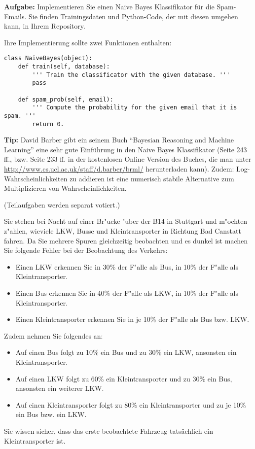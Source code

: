 \textbf{Aufgabe:} Implementieren Sie einen Naive Bayes Klassifikator für die
Spam-Emails. Sie finden Trainingsdaten und Python-Code, der mit diesen umgehen
kann, in Ihrem Repository.

Ihre Implementierung sollte zwei Funktionen enthalten:

\begin{verbatim}
class NaiveBayes(object):
    def train(self, database):
        ''' Train the classificator with the given database. '''
        pass

    def spam_prob(self, email):
        ''' Compute the probability for the given email that it is spam. '''
        return 0.

\end{verbatim}
    

\textbf{Tip:} David Barber gibt ein seinem Buch ``Bayesian Reasoning and Machine Learning''
eine sehr gute Einführung in den Naive Bayes Klassifikator (Seite 243 ff., bzw.
Seite 233 ff. in der kostenlosen Online Version des Buches, die man unter 
\url{http://www.cs.ucl.ac.uk/staff/d.barber/brml/} herunterladen kann). Zudem: Log-Wahrscheinlichkeiten zu addieren ist eine numerisch stabile Alternative zum Multiplizieren von Wahrscheinlichkeiten.


(Teilaufgaben werden separat votiert.)

Sie stehen bei Nacht auf einer Br"ucke "uber der B14 in Stuttgart und
m"ochten z"ahlen, wieviele LKW, Busse und Kleintransporter in Richtung
Bad Canstatt fahren. Da Sie mehrere Spuren gleichzeitig beobachten und
es dunkel ist machen Sie folgende Fehler bei der Beobachtung des Verkehrs:
\begin{itemize}
\item Einen LKW erkennen Sie in 30\% der F"alle als Bus, in 10\% der
  F"alle als Kleintransporter.
\item Einen Bus erkennen Sie in 40\% der F"alle als LKW, in 10\% der
  F"alle als Kleintransporter.
\item Einen Kleintransporter erkennen Sie in je 10\% der F"alle als
 Bus bzw. LKW.
\end{itemize}
Zudem nehmen Sie folgendes an:
\begin{itemize}
\item Auf einen Bus folgt zu 10\% ein Bus und zu 30\% ein LKW,
  ansonsten ein Kleintransporter.
\item Auf einen LKW folgt zu 60\% ein Kleintransporter und zu 30\% ein
  Bus, ansonsten ein weiterer LKW.
\item Auf einen Kleintransporter folgt zu 80\% ein Kleintransporter
  und zu je 10\% ein Bus bzw. ein LKW.
\end{itemize}
Sie wissen sicher, dass das erste beobachtete Fahrzeug tatsächlich ein
Kleintransporter ist.

